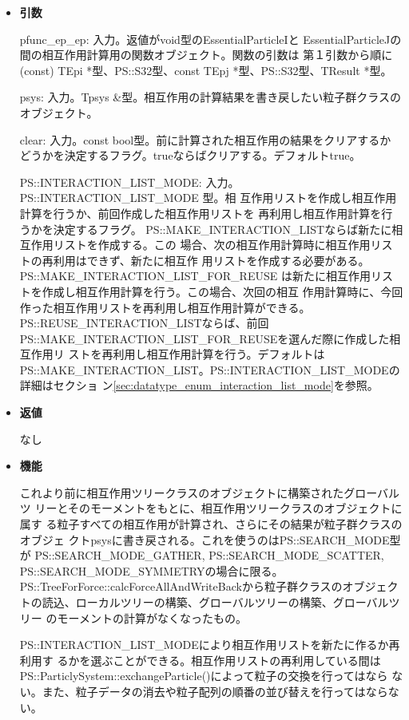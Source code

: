 \begin{itemize}

\item {\bf 引数}

pfunc\_ep\_ep: 入力。返値がvoid型のEssentialParticleIと
EssentialParticleJの間の相互作用計算用の関数オブジェクト。関数の引数は
第１引数から順に(const) TEpi *型、PS::S32型、const
TEpj *型、PS::S32型、TResult *型。

psys: 入力。Tpsys \&型。相互作用の計算結果を書き戻したい粒子群クラスの
オブジェクト。

clear: 入力。const bool型。前に計算された相互作用の結果をクリアするか
どうかを決定するフラグ。trueならばクリアする。デフォルトtrue。

PS::INTERACTION\_LIST\_MODE: 入力。PS::INTERACTION\_LIST\_MODE 型。相
互作用リストを作成し相互作用計算を行うか、前回作成した相互作用リストを
再利用し相互作用計算を行うかを決定するフラグ。
PS::MAKE\_INTERACTION\_LISTならば新たに相互作用リストを作成する。この
場合、次の相互作用計算時に相互作用リストの再利用はできず、新たに相互作
用リストを作成する必要がある。PS::MAKE\_INTERACTION\_LIST\_FOR\_REUSE
は新たに相互作用リストを作成し相互作用計算を行う。この場合、次回の相互
作用計算時に、今回作った相互作用リストを再利用し相互作用計算ができる。
PS::REUSE\_INTERACTION\_LISTならば、前回
PS::MAKE\_INTERACTION\_LIST\_FOR\_REUSEを選んだ際に作成した相互作用リ
ストを再利用し相互作用計算を行う。デフォルトは
PS::MAKE\_INTERACTION\_LIST。PS::INTERACTION\_LIST\_MODEの詳細はセクショ
ン\ref{sec:datatype_enum_interaction_list_mode}を参照。

\item {\bf 返値}

なし

\item {\bf 機能}

これより前に相互作用ツリークラスのオブジェクトに構築されたグローバルツ
リーとそのモーメントをもとに、相互作用ツリークラスのオブジェクトに属す
る粒子すべての相互作用が計算され、さらにその結果が粒子群クラスのオブジェ
クトpsysに書き戻される。これを使うのはPS::SEARCH\_MODE型が
PS::SEARCH\_MODE\_GATHER, PS::SEARCH\_MODE\_SCATTER,
PS::SEARCH\_MODE\_SYMMETRYの場合に限る。
PS::TreeForForce::calcForceAllAndWriteBackから粒子群クラスのオブジェク
トの読込、ローカルツリーの構築、グローバルツリーの構築、グローバルツリー
のモーメントの計算がなくなったもの。

PS::INTERACTION\_LIST\_MODEにより相互作用リストを新たに作るか再利用す
るかを選ぶことができる。相互作用リストの再利用している間は
PS::ParticlySystem::exchangeParticle()によって粒子の交換を行ってはなら
ない。また、粒子データの消去や粒子配列の順番の並び替えを行ってはならな
い。

\end{itemize}

